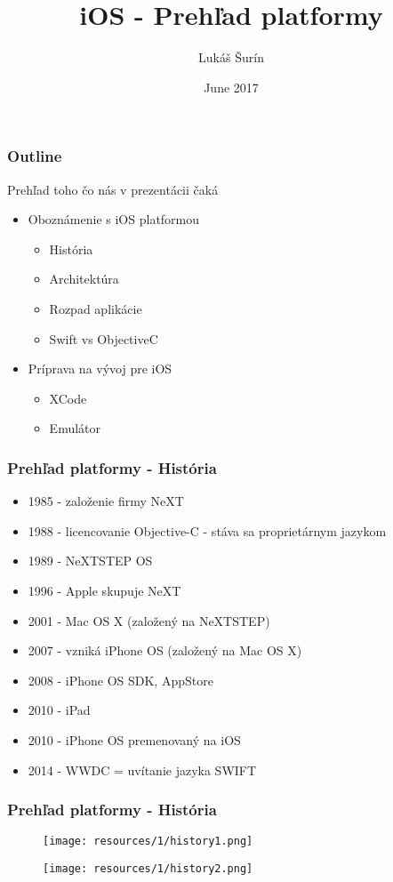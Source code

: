 \documentclass[serif,mathserif]{beamer}
\author[Lukáš Šurín]{Lukáš Šurín}
\title[Prehľad platformy\hspace{2em}\insertframenumber/\inserttotalframenumber]{iOS - Prehľad platformy }
\date{June 2017}
\institute{Profinit}
\begin{document}
\maketitle

\begin{frame}
  \frametitle{Outline}
  Prehľad toho čo nás v prezentácii čaká\pause
  \begin{itemize}
  \item Oboznámenie s iOS platformou\pause
   \begin{itemize}
      \item História\pause
      \item Architektúra\pause
      \item Rozpad aplikácie\pause
      \item Swift vs ObjectiveC\pause
  \end{itemize}
  \item Príprava na vývoj pre iOS\pause
  \begin{itemize}
      \item XCode\pause
      \item Emulátor
  \end{itemize}
  \end{itemize}
\end{frame}

\begin{frame}
  \frametitle{Prehľad platformy - História}
  \begin{itemize}
	\item 1985 - založenie firmy NeXT \pause
	\item 1988 - licencovanie Objective-C - stáva sa proprietárnym jazykom\pause
	\item 1989 - NeXTSTEP OS\pause
	\item 1996 - Apple skupuje NeXT\pause
	\item 2001 - Mac OS X (založený na NeXTSTEP)\pause
	\item 2007 - vzniká iPhone OS (založený na Mac OS X)\pause
	\item 2008 - iPhone OS SDK, AppStore\pause
	\item 2010 - iPad\pause
	\item 2010 - iPhone OS premenovaný na iOS\pause
	\item 2014 - WWDC = uvítanie jazyka SWIFT
  \end{itemize}
\end{frame}

\begin{frame}
  \frametitle{Prehľad platformy - História}
  \begin{figure}[h]
	\texttt{[image: resources/1/history1.png]}
  \end{figure}
  \begin{figure}[h]
	\texttt{[image: resources/1/history2.png]}
  \end{figure}
  	
\end{frame}
\end{document}
